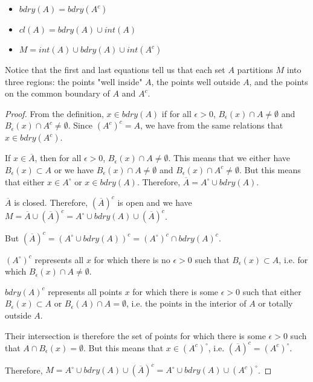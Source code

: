 \begin{itemize}
    \item $bdry(A) = bdry(A^c)$
    \item $cl(A) = bdry(A) \cup int(A)$
    \item $M = int(A) \cup bdry(A) \cup int(A^c)$
\end{itemize}

Notice that the first and last equations tell us that each set $A$ partitions $M$ into three regions: the points "well inside" $A$, the points well outside $A$, and the points on the common boundary of $A$ and $A^c$.

\begin{proof}
From the definition, $x \in bdry(A)$ if for all $\epsilon > 0$, $B_\epsilon(x) \cap A \neq \emptyset$ and $B_\epsilon(x) \cap A^c \neq \emptyset$. Since $(A^c)^c = A$, we have from the same relations that $x \in bdry(A^c)$.

\vspace{1em}

If $x \in \overline{A}$, then for all $\epsilon>0$, $B_\epsilon(x) \cap A \neq \emptyset$. This means that we either have $B_\epsilon(x) \subset A$ or we have $B_\epsilon(x) \cap A \neq \emptyset$ and $B_\epsilon(x) \cap A^c \neq \emptyset$. But this means that either $x \in A^\circ$ or $x \in bdry(A)$. Therefore, $\overline{A} = A^\circ \cup bdry(A)$.


\vspace{1em}

$\overline{A}$ is closed. Therefore, $(\overline{A})^c$ is open and we have $M = \overline{A} \cup (\overline{A})^c = A^\circ \cup bdry(A) \cup (\overline{A})^c$.

But $(\overline{A})^c = (A^\circ \cup bdry(A))^c = (A^\circ)^c \cap bdry(A)^c$.

$(A^\circ)^c$ represents all $x$ for which there is no $\epsilon > 0$ such that $B_\epsilon(x) \subset A$, i.e. for which $B_\epsilon(x) \cap A \neq \emptyset$.

$bdry(A)^c$ represents all points $x$ for which there is some $\epsilon > 0$ such that either $B_\epsilon(x) \subset A$ or $B_\epsilon(A) \cap A = \emptyset$, i.e. the points in the interior of $A$ or totally outside $A$.

Their intersection is therefore the set of points for which there is some $\epsilon > 0$ such that $A \cap B_\epsilon(x) = \emptyset$. But this means that $x \in (A^c)^\circ$, i.e. $(\overline{A})^c = (A^c)^\circ$.

Therefore, $M = A^\circ \cup bdry(A) \cup (\overline{A})^c = A^\circ \cup bdry(A) \cup (A^c)^\circ$.

\end{proof}

